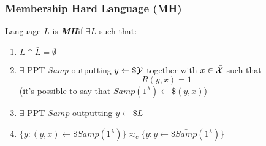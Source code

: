 \subsubsection{Membership Hard Language (MH)}
\begin{definition}
    Language $L$ is \textit{ \textbf{MH}}if $ \exists  \bar{L}$ such that:
    \begin{enumerate}
        \item $L \cap \bar{L} = \emptyset$
        \item $ \exists$ PPT \textit{Samp} outputting $y \leftarrow\$ \mathcal{Y}$
            together with $x \in \bar{\mathcal{X}}$ such that 
            \[
              R(y,x)=1  
            \]
            (it's possible
            to say that $Samp(1^{\lambda}) \leftarrow\$ (y,x)$)
        \item $ \exists$ PPT $\bar{Samp}$ outputting $y \leftarrow\$ \bar{L}$
        \item $\{y:(y,x) \leftarrow\$ Samp(1^{\lambda})\} \approx_{c} \{y:y
            \leftarrow\$ \bar{Samp}(1^{\lambda})\}$
    \end{enumerate}
    
\end{definition}

